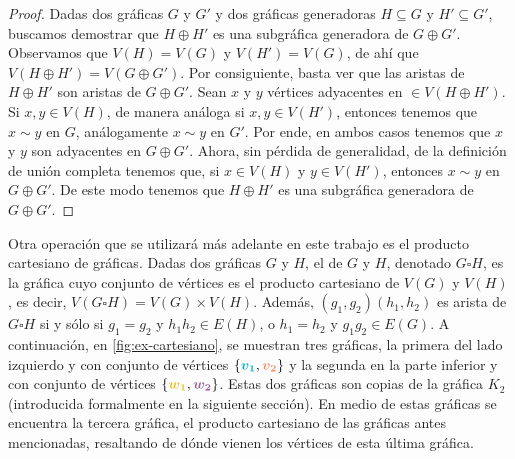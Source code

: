 \begin{proof}
    Dadas dos gr\'aficas $G$ y $G'$ y dos gr\'aficas generadoras $H \subseteq G$
    y $H'\subseteq G'$, buscamos demostrar que $H \oplus H'$ es una subgr\'afica
    generadora de $G \oplus G'$. Observamos que $V(H)=V(G)$ y $V(H')=V(G)$, de
    ah\'i que $V(H \oplus H')=V(G \oplus G')$. Por consiguiente, basta ver que
    las aristas de $H \oplus H'$ son aristas de $G \oplus G'$. Sean $x$ y $y$
    v\'ertices adyacentes en $\in V(H \oplus H')$. Si $x,y \in V(H)$, de manera
    an\'aloga si $x,y \in V(H')$, entonces tenemos que $x \sim y$ en $G$,
    an\'alogamente $x \sim y$ en $G'$. Por ende, en ambos casos tenemos que $x$
    y $y$ son adyacentes en $G \oplus G'$. Ahora, sin p\'erdida de generalidad,
    de la definici\'on de  uni\'on completa tenemos que, si $x \in V(H)$ y $y
    \in V(H')$, entonces $x \sim y$ en $G \oplus G'$. De este modo tenemos que
    $H \oplus H'$ es una subgr\'afica generadora de $G \oplus G'$.
\end{proof}

Otra operaci\'on que se utilizar\'a m\'as adelante en este trabajo es el
producto cartesiano de gr\'aficas. Dadas dos gr\'aficas $G$ y $H$, el
 de $G$ y $H$, denotado $G \square H$, es la
gr\'afica cuyo conjunto de v\'ertices es el producto cartesiano de $V(G)$ y
$V(H)$, es decir, $V(G \square H) = V(G) \times V(H)$. Adem\'as,
$(g_1,g_2)(h_1,h_2)$ es arista de $G \square H$ si y s\'olo si $g_1 = g_2$ y
$h_1h_2 \in E(H)$, o $h_1 = h_2$ y $g_1g_2 \in E(G)$. A continuaci\'on, en
\cref{fig:ex-cartesiano}, se muestran tres gr\'aficas, la primera del lado
izquierdo y con conjunto de v\'ertices $\{{\color{azulCielo}\boldsymbol{{v_1}}},
{\color{coral}\boldsymbol{{v_2}}}\}$ y la segunda en la parte inferior y con
conjunto de v\'ertices
$\{{\color{amarillo}\boldsymbol{{w_1}}},{\color{morado}\boldsymbol{{w_2}}}\}$.
Estas dos gr\'aficas son copias de la gr\'afica $K_2$ (introducida formalmente
en la siguiente secci\'on). En medio de estas gr\'aficas se encuentra la tercera
gr\'afica, el producto cartesiano de las gr\'aficas antes mencionadas,
resaltando de d\'onde vienen los v\'ertices de esta \'ultima gr\'afica.

